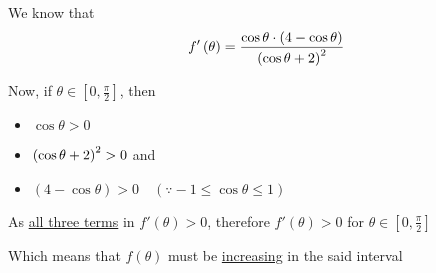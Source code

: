 \documentclass[14pt,fleqn]{extarticle}
\begin{document}
\newcard 

We know that 
\[ \quad f' \left(\theta \right) = \frac{\cos\theta\cdot \left(4-\cos\theta \right)}{\left(\cos\theta + 2 \right)^2} \]

Now, if $\theta\in \left[0,\frac\pi{2} \right]$, then 

\begin{itemize}
\item {$\cos\theta > 0$} 
\item {$\left(\cos\theta + 2 \right)^2 > 0$ and }
\item {$ \left(4-\cos\theta \right) > 0 \quad \left(\because -1\leq \cos\theta \leq 1 \right)$ }
\end{itemize} 

As \underline{all three terms} in $f' \left(\theta \right) > 0$, therefore $f' \left(\theta \right) > 0$ for $\theta\in \left[0, \frac{\pi}{2} \right]$ \newline 

Which means that $f \left(\theta \right)$ must be \underline{increasing} in the said interval 
\end{document}

